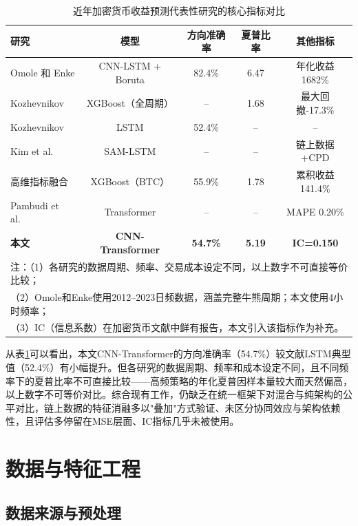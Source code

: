 \documentclass[12pt,a4paper]{ctexart}
\begin{document}
\begin{table}[H]
\centering
\caption{近年加密货币收益预测代表性研究的核心指标对比}
\label{tab:lit_comparison}
\small
\begin{tabular}{lcccc}
\toprule
研究 & 模型 & 方向准确率 & 夏普比率 & 其他指标 \\
\midrule
Omole 和 Enke \cite{omole2024} & CNN-LSTM + Boruta & 82.4\% & 6.47 & 年化收益1682\% \\
Kozhevnikov \cite{kozh2025} & XGBoost（全周期） & -- & 1.68 & 最大回撤-17.3\% \\
Kozhevnikov \cite{kozh2025} & LSTM & 52.4\% & -- & -- \\
Kim et al.\ \cite{kim2022} & SAM-LSTM & -- & -- & 链上数据+CPD \\
高维指标融合 \cite{findev2025} & XGBoost（BTC） & 55.9\% & 1.78 & 累积收益141.4\% \\
Pambudi et al.\ \cite{pambudi2025} & Transformer & -- & -- & MAPE 0.20\% \\
\textbf{本文} & \textbf{CNN-Transformer} & \textbf{54.7\%} & \textbf{5.19} & \textbf{IC=0.150} \\
\bottomrule
\multicolumn{5}{l}{\small 注：（1）各研究的数据周期、频率、交易成本设定不同，以上数字不可直接等价比较；} \\
\multicolumn{5}{l}{\small （2）Omole和Enke使用2012--2023日频数据，涵盖完整牛熊周期；本文使用4小时频率；} \\
\multicolumn{5}{l}{\small （3）IC（信息系数）在加密货币文献中鲜有报告，本文引入该指标作为补充。}
\end{tabular}
\end{table}

从表\ref{tab:lit_comparison}可以看出，本文CNN-Transformer的方向准确率（54.7\%）较文献LSTM典型值（52.4\%）有小幅提升。但各研究的数据周期、频率和成本设定不同，且不同频率下的夏普比率不可直接比较——高频策略的年化夏普因样本量较大而天然偏高，以上数字不可等价对比。综合现有工作，仍缺乏在统一框架下对混合与纯架构的公平对比，链上数据的特征消融多以"叠加"方式验证、未区分协同效应与架构依赖性，且评估多停留在MSE层面、IC指标几乎未被使用。

\section{数据与特征工程}

\subsection{数据来源与预处理}
\end{document}
